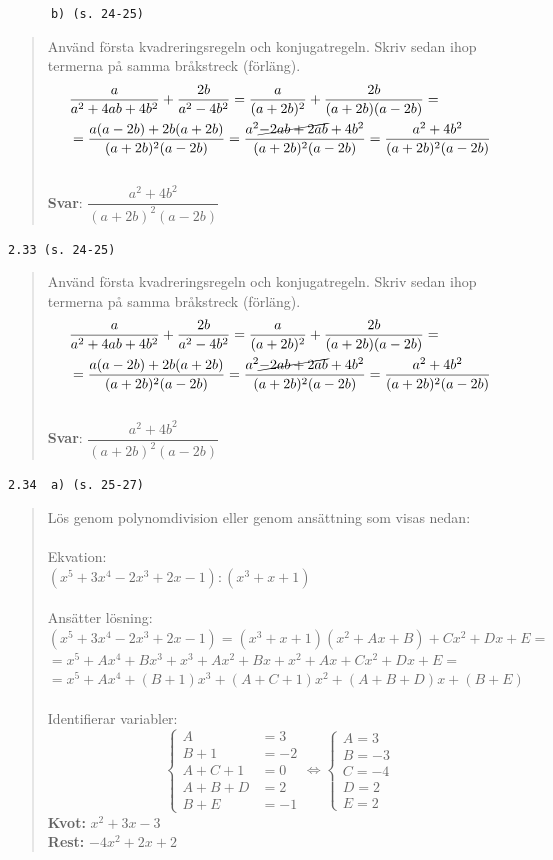 \documentclass[a4paper]{article}
\newcommand{\tskcol}[1]{\textcolor{tskcol}{#1}}
\begin{document}
	\texttt{\tskcol{~~~~~~b) (s. 24-25)}}
	\begin{quotation}
		\noindent
		Använd första kvadreringsregeln och konjugatregeln. Skriv sedan ihop termerna på samma bråkstreck (förläng).
		\begin{align*}
			& \frac{a}{a^2+4ab+4b^2}+\frac{2b}{a^2-4b^2}=
			\frac{a}{(a+2b)^2}+\frac{2b}{(a+2b)(a-2b)}= \\
			& =\frac{a(a-2b)+2b(a+2b)}{(a+2b)^2(a-2b)}=
			\frac{a^2\cancel{-2ab+2ab}+4b^2}{(a+2b)^2(a-2b)}=
			\frac{a^2+4b^2}{(a+2b)^2(a-2b)}
		\end{align*}
		\\
		\textbf{Svar}: $\dfrac{a^2+4b^2}{(a+2b)^2(a-2b)}$
	\end{quotation}
	
	\texttt{\tskcol{2.33 (s. 24-25)}}
	\begin{quotation}
		\noindent
		Använd första kvadreringsregeln och konjugatregeln. Skriv sedan ihop termerna på samma bråkstreck (förläng).
		\begin{align*}
		& \frac{a}{a^2+4ab+4b^2}+\frac{2b}{a^2-4b^2}=
		\frac{a}{(a+2b)^2}+\frac{2b}{(a+2b)(a-2b)}= \\
		& =\frac{a(a-2b)+2b(a+2b)}{(a+2b)^2(a-2b)}=
		\frac{a^2\cancel{-2ab+2ab}+4b^2}{(a+2b)^2(a-2b)}=
		\frac{a^2+4b^2}{(a+2b)^2(a-2b)}
		\end{align*}
		\\
		\textbf{Svar}: $\dfrac{a^2+4b^2}{(a+2b)^2(a-2b)}$
	\end{quotation}
	
	\pagebreak
	\texttt{\tskcol{2.34~~a) (s. 25-27)}}
	\begin{quotation}
		\noindent
		Lös genom polynomdivision eller genom ansättning som visas nedan: \\ \\
		Ekvation: \\
		$(x^5+3x^4-2x^3+2x-1):(x^3+x+1)$ \\ \\
		Ansätter lösning: \\
		$(x^5+3x^4-2x^3+2x-1)=(x^3+x+1)(x^2+Ax+B)+Cx^2+Dx+E=$ \\
		$=x^5+Ax^4+Bx^3+x^3+Ax^2+Bx+x^2+Ax+Cx^2+Dx+E=$ \\
		$=x^5+Ax^4+(B+1)x^3+(A+C+1)x^2+(A+B+D)x+(B+E)$ \\ \\
		Identifierar variabler:\\
		\[\begin{cases} 
		A&=3 \\ 
		B+1&=-2 \\ 
		A+C+1&=0 \\
		A+B+D&=2 \\
		B+E&=-1
		\end{cases}
		\Leftrightarrow
		\begin{cases} 
		A=3 \\ 
		B=-3 \\
		C=-4 \\
		D=2 \\
		E=2
		\end{cases}\]
		\textbf{Kvot:} $x^2+3x-3$ \\
		\textbf{Rest:} $-4x^2+2x+2$
	\end{quotation}
	
\end{document}
